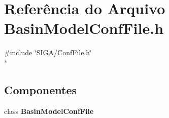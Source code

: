 \section{Referência do Arquivo Basin\+Model\+Conf\+File.\+h}
\label{_basin_model_conf_file_8h}
{\ttfamily \#include \char`\"{}S\+I\+G\+A/\+Conf\+File.\+h\char`\"{}}\\*
\subsection*{Componentes}
\begin{DoxyCompactItemize}
\item 
class {\bf Basin\+Model\+Conf\+File}
\end{DoxyCompactItemize}
